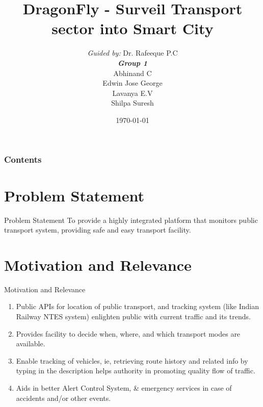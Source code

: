 \documentclass{beamer}
\title[DragonFly]{DragonFly - Surveil Transport sector into Smart City}
\author[Group1]{
	{\small \textit{Guided by:}} Dr. Rafeeque P.C \\
	\medskip
	{\small \textbf{\textit{Group 1}}} \\
	Abhinand C \\
	Edwin Jose George \\
	Lavanya E.V \\
	Shilpa Suresh
}
\institute[GCEK]{Government College of Engineering Kannur}
\date{\today}
\begin{document}
	
	\begin{frame}
		\titlepage
	\end{frame}
	
	\begin{frame}
		\frametitle{Contents}
		\tableofcontents
	\end{frame}
	
	
	\section{Problem Statement}
	\begin{frame}{Problem Statement}
		To provide a highly integrated platform that monitors public transport system, providing safe and easy transport facility.
	\end{frame}
	
	\section{Motivation and Relevance}
	\begin{frame}{Motivation and Relevance}
		\begin{enumerate}
			\item Public APIs for location of public transport, and tracking system (like Indian Railway NTES system) enlighten public with current traffic and its trends.
			\item Provides facility to decide when, where, and which transport modes are available.
			\item Enable tracking of vehicles, ie, retrieving route history and related info by typing in the description helps authority in promoting quality flow of traffic.
			\item Aids in better Alert Control System, \& emergency services in case of accidents and/or other events.
			
		\end{enumerate}
	\end{frame}
	
\end{document}
